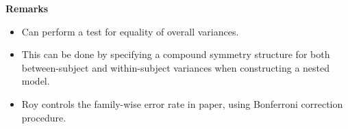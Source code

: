 \documentclass[compress]{beamer}        %
\makeatletter
\newcommand{\tcb}{\textcolor{beamer@blendedblue}}
\makeatother
\begin{document}
\begin{frame}[fragile]{\bf \tcb{Remarks}}
\begin{itemize}
\item Can perform a test for equality of overall variances.\\
\vspace{0.25cm}\item This can be done by specifying a compound symmetry structure for both between-subject and within-subject variances when constructing a nested model.\\
\vspace{0.25cm}\item Roy controls the family-wise error rate in paper, using Bonferroni correction procedure.
\end{itemize}
\end{frame}



















\end{document}
